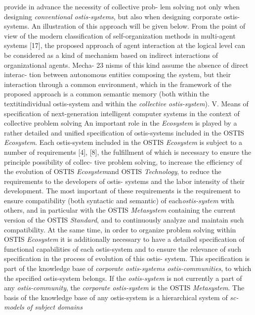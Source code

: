 \documentclass{article}
\begin{document}
provide in advance the necessity of collective prob-
lem solving not only when designing \textit{conventional
ostis-systems}, but also when designing corporate
ostis-systems. An illustration of this approach will
be given below.
From the point of view of the modern classification
of self-organization methods in multi-agent systems [17],
the proposed approach of agent interaction at the logical
level can be considered as a kind of mechanism based
on indirect interactions of organizational agents. Mecha-
23
nisms of this kind assume the absence of direct interac-
tion between autonomous entities composing the system,
but their interaction through a common environment,
which in the framework of the proposed approach is a
common semantic memory (both within the textit{individual
ostis-system} and within the \textit{collective ostis-system}).
V. Means of specification of next-generation intelligent
computer systems in the context of collective problem
solving
An important role in the \textit{Ecosystem} is played by a
rather detailed and unified specification of ostis-systems
included in the OSTIS \textit{Ecosystem}. Each ostis-system
included in the OSTIS \textit{Ecosystem} is subject to a number
of requirements [4], [8], the fulfillment of which is
necessary to ensure the principle possibility of collec-
tive problem solving, to increase the efficiency of the
evolution of OSTIS \textit{Ecosystem}and OSTIS \textit{Technology},
to reduce the requirements to the developers of ostis-
systems and the labor intensity of their development. The
most important of these requirements is the requirement
to ensure compatibility (both syntactic and semantic)
of each\textit{ostis-system} with others, and in particular with
the OSTIS \textit{Metasystem} containing the current version of
the OSTIS \textit{Standard}, and to continuously analyze and
maintain such compatibility.
At the same time, in order to organize problem solving
within OSTIS \textit{Ecosystem} it is additionally necessary to
have a detailed specification of functional capabilities of
each ostis-system and to ensure the relevance of such
specification in the process of evolution of this ostis-
system. This specification is part of the knowledge base
of \textit{corporate ostis-systems ostis-communities}, to which
the specified ostis-system belongs. If the \textit{ostis-system} is
not currently a part of any \textit{ostis-community}, the \textit{corporate
ostis-system} is the OSTIS \textit{Metasystem}.
The basis of the knowledge base of any ostis-system
is a hierarchical system of \textit{sc-models of subject domains}
\end{document}
